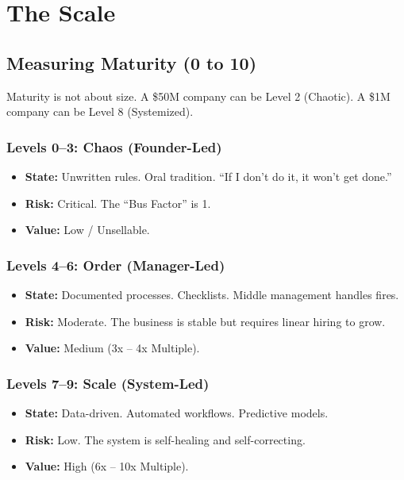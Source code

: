 \documentclass[11pt, a4paper, oneside]{report}
\begin{document}
\chapter{The Scale}
\section*{Measuring Maturity (0 to 10)}

Maturity is not about size. A \$50M company can be Level 2 (Chaotic). A \$1M company can be Level 8 (Systemized).

\subsection*{Levels 0--3: Chaos (Founder-Led)}
\begin{itemize}
    \item \textbf{State:} Unwritten rules. Oral tradition. ``If I don't do it, it won't get done.''
    \item \textbf{Risk:} Critical. The ``Bus Factor'' is 1.
    \item \textbf{Value:} Low / Unsellable.
\end{itemize}

\subsection*{Levels 4--6: Order (Manager-Led)}
\begin{itemize}
    \item \textbf{State:} Documented processes. Checklists. Middle management handles fires.
    \item \textbf{Risk:} Moderate. The business is stable but requires linear hiring to grow.
    \item \textbf{Value:} Medium (3x -- 4x Multiple).
\end{itemize}

\subsection*{Levels 7--9: Scale (System-Led)}
\begin{itemize}
    \item \textbf{State:} Data-driven. Automated workflows. Predictive models.
    \item \textbf{Risk:} Low. The system is self-healing and self-correcting.
    \item \textbf{Value:} High (6x -- 10x Multiple).
\end{itemize}
\end{document}
